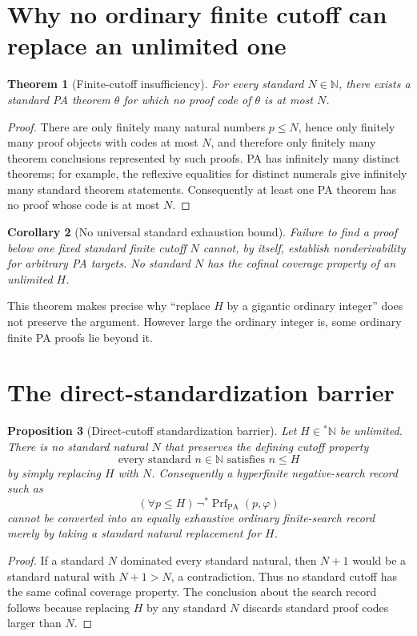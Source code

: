 \documentclass[11pt,openany]{book}
\newtheorem{theorem}{Theorem}[chapter]
\newtheorem{proposition}[theorem]{Proposition}
\newtheorem{corollary}[theorem]{Corollary}
\theoremstyle{definition}
\theoremstyle{remark}
\newcommand{\N}{\mathbb{N}}
\newcommand{\Prf}{\operatorname{Prf}}
\begin{document}
\section{Why no ordinary finite cutoff can replace an unlimited one}
\begin{theorem}[Finite-cutoff insufficiency]\label{thm:finitecutoff}
For every standard $N\in\N$, there exists a standard PA theorem $\theta$ for which no proof code of $\theta$ is at most $N$.
\end{theorem}
\begin{proof}
There are only finitely many natural numbers $p\le N$, hence only finitely many proof objects with codes at most $N$, and therefore only finitely many theorem conclusions represented by such proofs. PA has infinitely many distinct theorems; for example, the reflexive equalities for distinct numerals give infinitely many standard theorem statements. Consequently at least one PA theorem has no proof whose code is at most $N$.
\end{proof}

\begin{corollary}[No universal standard exhaustion bound]\label{cor:nostandardcutoff}
Failure to find a proof below one fixed standard finite cutoff $N$ cannot, by itself, establish nonderivability for arbitrary PA targets. No standard $N$ has the cofinal coverage property of an unlimited $H$.
\end{corollary}

This theorem makes precise why ``replace $H$ by a gigantic ordinary integer'' does not preserve the argument. However large the ordinary integer is, some ordinary finite PA proofs lie beyond it.

\section{The direct-standardization barrier}
\begin{proposition}[Direct-cutoff standardization barrier]\label{prop:standardbarrier}
Let $H\in{}^*\N$ be unlimited. There is no standard natural $N$ that preserves the defining cutoff property
\[
\text{every standard }n\in\N\text{ satisfies }n\le H
\]
by simply replacing $H$ with $N$. Consequently a hyperfinite negative-search record such as
\[
(\forall p\le H)\,\neg{}^*\!\Prf_{\mathrm{PA}}(p,\varphi)
\]
cannot be converted into an equally exhaustive ordinary finite-search record merely by taking a standard natural replacement for $H$.
\end{proposition}
\begin{proof}
If a standard $N$ dominated every standard natural, then $N+1$ would be a standard natural with $N+1>N$, a contradiction. Thus no standard cutoff has the same cofinal coverage property. The conclusion about the search record follows because replacing $H$ by any standard $N$ discards standard proof codes larger than $N$.
\end{proof}
\end{document}
